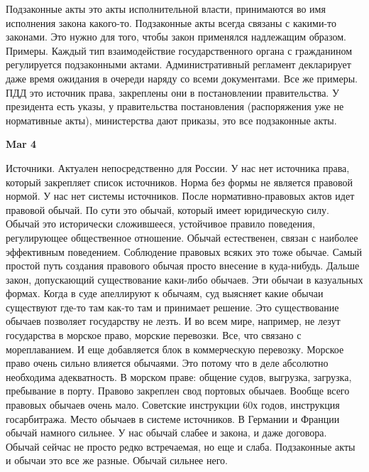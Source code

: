 \documentclass[a4paper, 12pt]{article}
\def\datee#1{\hfill\textbf{#1} \par}
\begin{document}
Подзаконные акты это акты исполнительной власти, принимаются во имя исполнения закона какого-то. Подзаконные акты всегда связаны с какими-то законами. Это нужно для того, чтобы закон применялся надлежащим образом. Примеры. Каждый тип взаимодействие государственного органа с гражданином регулируется подзаконными актами. Административный регламент декларирует даже время ожидания в очереди наряду со всеми документами. Все же примеры. ПДД это источник права, закреплены они в постановлении правительства. У президента есть указы, у правительства постановления (распоряжения уже не нормативные акты), министерства дают приказы, это все подзаконные акты. 

\datee{Mar 4}

Источники. Актуален непосредственно для России. У нас нет источника права, который закрепляет список источников. Норма без формы не является правовой нормой. У нас нет системы источников. После нормативно-правовых актов идет правовой обычай. По сути это обычай, который имеет юридическую силу. Обычай это исторически сложившееся, устойчивое правило поведения, регулирующее общественное отношение. Обычай естественен, связан с наиболее эффективным поведением. Соблюдение правовых всяких это тоже обычае. Самый простой путь создания правового обычая просто внесение в куда-нибудь. Дальше закон, допускающий существование каки-либо обычаев. Эти обычаи в казуальных формах. Когда в суде апеллируют к обычаям, суд выясняет какие обычаи существуют где-то там как-то там и принимает решение. Это существование обычаев позволяет государству не лезть. И во всем мире, например, не лезут государства в морское право, морские перевозки. Все, что связано с мореплаванием. И еще добавляется блок в коммерческую перевозку. Морское право очень сильно влияется обычаями. Это потому что в деле абсолютно необходима адекватность. В морском праве: общение судов, выгрузка, загрузка, пребывание в порту. Правово закреплен свод портовых обычаев. Вообще всего правовых обычаев очень мало. Советские инструкции 60х годов, инструкция госарбитража. Место обычаев в системе источников. В Германии и Франции обычай намного сильнее. У нас обычай слабее и закона, и даже договора. Обычай сейчас не просто редко встречаемая, но еще и слаба. Подзаконные акты и обычаи это все же разные. Обычай сильнее него. 
\end{document}

